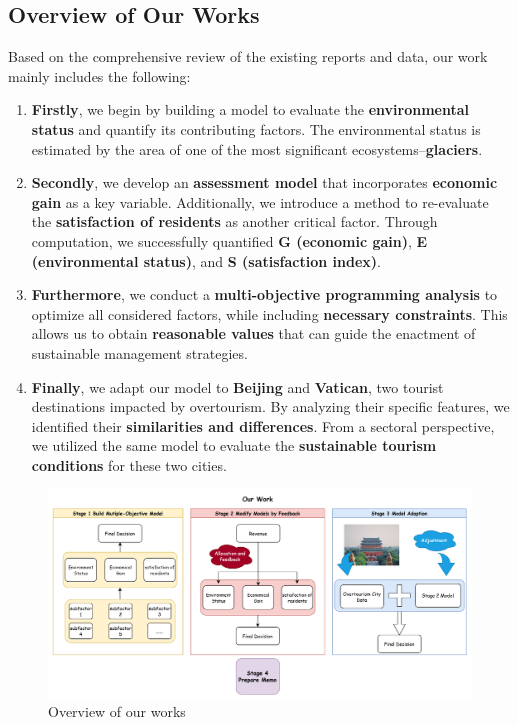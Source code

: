 \documentclass[UTF8]{mcmthesis}
\begin{document}
           \subsection{Overview of Our Works}
           \hspace*{2em} Based on the comprehensive review of the existing reports and data, our work mainly includes the following:
           
           \begin{enumerate}
               \item \textbf{Firstly}, we begin by building a model to evaluate the \textbf{environmental status} and quantify its contributing factors. The environmental status is estimated by the area of one of the most significant ecosystems--\textbf{glaciers}.
               
               \item \textbf{Secondly}, we develop an \textbf{assessment model} that incorporates \textbf{economic gain} as a key variable. Additionally, we introduce a method to re-evaluate the \textbf{satisfaction of residents} as another critical factor. Through computation, we successfully quantified \textbf{G (economic gain)}, \textbf{E (environmental status)}, and \textbf{S (satisfaction index)}.
               
               \item \textbf{Furthermore}, we conduct a \textbf{multi-objective programming analysis} to optimize all considered factors, while including \textbf{necessary constraints}. This allows us to obtain \textbf{reasonable values} that can guide the enactment of sustainable management strategies.
               
               \item \textbf{Finally}, we adapt our model to \textbf{Beijing} and \textbf{Vatican}, two tourist destinations impacted by overtourism. By analyzing their specific features, we identified their \textbf{similarities and differences}. From a sectoral perspective, we utilized the same model to evaluate the \textbf{sustainable tourism conditions} for these two cities.
           \end{enumerate}
           
           
            \begin{figure}[htbp]
 
                \hspace{-1cm} %
                \includegraphics[width=18cm]{overview.png}
                \caption{Overview of our works}
            \end{figure}
\end{document}
